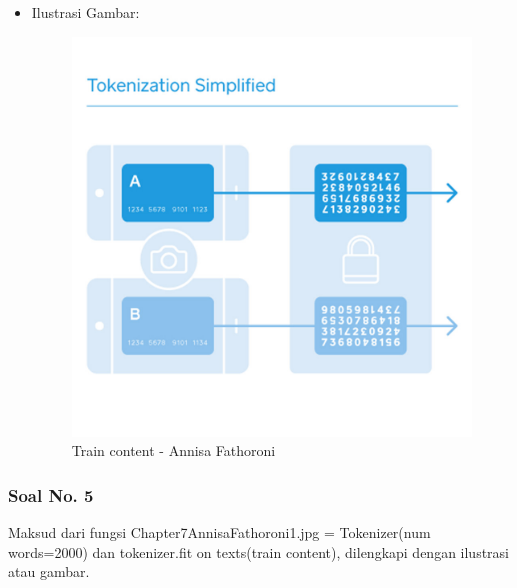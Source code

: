 \begin{itemize}
    \item Ilustrasi Gambar:

    \begin{figure}[!hbtp]
    \centering
    \includegraphics[scale=0.4]{figures/Chapter 7/1164067/Teori/Chapter7AnnisaFathoroni1.jpg}
    \caption{Train content - Annisa Fathoroni}
    \label{Train content - Annisa Fathoroni}
    \end{figure}
\end{itemize}

\subsubsection{Soal No. 5}
Maksud dari fungsi Chapter7AnnisaFathoroni1.jpg = Tokenizer(num words=2000) dan tokenizer.fit on texts(train content), dilengkapi dengan ilustrasi atau gambar.

